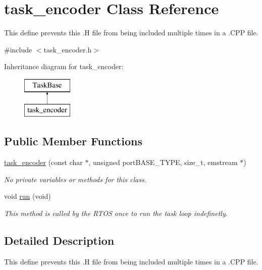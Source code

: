 \hypertarget{classtask__encoder}{\section{task\-\_\-encoder Class Reference}
\label{classtask__encoder}
}


This define prevents this .H file from being included multiple times in a .C\-P\-P file.  




{\ttfamily \#include $<$task\-\_\-encoder.\-h$>$}

Inheritance diagram for task\-\_\-encoder\-:\begin{figure}[H]
\begin{center}
\leavevmode
\includegraphics[height=2.000000cm]{classtask__encoder}
\end{center}
\end{figure}
\subsection*{Public Member Functions}
\begin{DoxyCompactItemize}
\item 
\hyperlink{classtask__encoder_aa05fce9c58c6e814ea85699eb2d790cf}{task\-\_\-encoder} (const char $\ast$, unsigned port\-B\-A\-S\-E\-\_\-\-T\-Y\-P\-E, size\-\_\-t, emstream $\ast$)
\begin{DoxyCompactList}\small\item\em No private variables or methods for this class. \end{DoxyCompactList}\item 
void \hyperlink{classtask__encoder_a8380b1f111bf5d6b4256f16e355c0afc}{run} (void)
\begin{DoxyCompactList}\small\item\em This method is called by the R\-T\-O\-S once to run the task loop indefinetly. \end{DoxyCompactList}\end{DoxyCompactItemize}


\subsection{Detailed Description}
This define prevents this .H file from being included multiple times in a .C\-P\-P file. 

